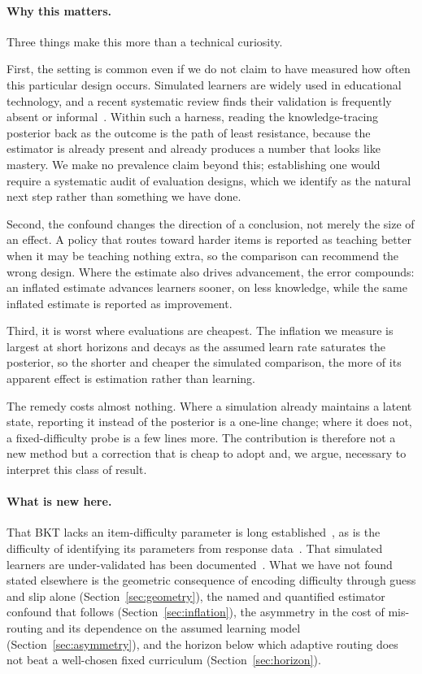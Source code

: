 \documentclass[notitlepage,12pt]{jedm}
\begin{document}
\paragraph{Why this matters.} Three things make this more than a technical curiosity.

First, the setting is common even if we do not claim to have measured how often this particular design occurs. Simulated learners are widely used in educational technology, and a recent systematic review finds their validation is frequently absent or informal~\cite{kaser2024simulated}. Within such a harness, reading the knowledge-tracing posterior back as the outcome is the path of least resistance, because the estimator is already present and already produces a number that looks like mastery. We make no prevalence claim beyond this; establishing one would require a systematic audit of evaluation designs, which we identify as the natural next step rather than something we have done.

Second, the confound changes the direction of a conclusion, not merely the size of an effect. A policy that routes toward harder items is reported as teaching better when it may be teaching nothing extra, so the comparison can recommend the wrong design. Where the estimate also drives advancement, the error compounds: an inflated estimate advances learners sooner, on less knowledge, while the same inflated estimate is reported as improvement.

Third, it is worst where evaluations are cheapest. The inflation we measure is largest at short horizons and decays as the assumed learn rate saturates the posterior, so the shorter and cheaper the simulated comparison, the more of its apparent effect is estimation rather than learning.

The remedy costs almost nothing. Where a simulation already maintains a latent state, reporting it instead of the posterior is a one-line change; where it does not, a fixed-difficulty probe is a few lines more. The contribution is therefore not a new method but a correction that is cheap to adopt and, we argue, necessary to interpret this class of result.

\paragraph{What is new here.} That BKT lacks an item-difficulty parameter is long established~\cite{pardos2011ktidem}, as is the difficulty of identifying its parameters from response data~\cite{beck2007identifiability}. That simulated learners are under-validated has been documented~\cite{kaser2024simulated}. What we have not found stated elsewhere is the geometric consequence of encoding difficulty through guess and slip alone (Section~\ref{sec:geometry}), the named and quantified estimator confound that follows (Section~\ref{sec:inflation}), the asymmetry in the cost of mis-routing and its dependence on the assumed learning model (Section~\ref{sec:asymmetry}), and the horizon below which adaptive routing does not beat a well-chosen fixed curriculum (Section~\ref{sec:horizon}).
\end{document}

